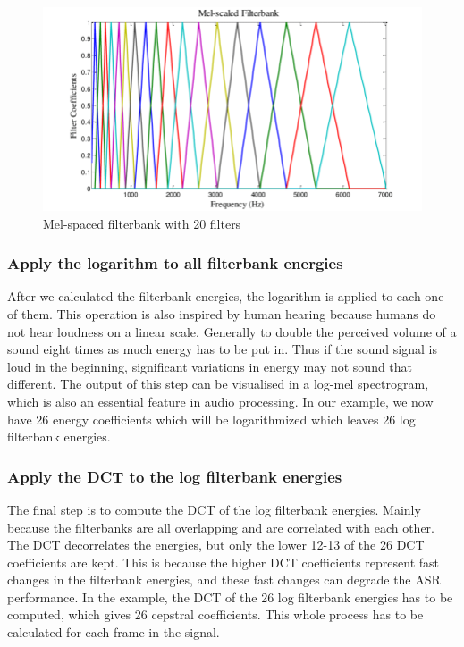 \begin{figure}[htbp]
	\centering
	\includegraphics[scale=0.4]{baa-documentation/img/Mel-filter-banks-basis-functions-using-20-Mel-filters-in-the-filter-bank.png}
	\caption[Mel-spaced filterbank with 20 filters]{Mel-spaced filterbank with 20 filters \footnotemark}
	\label{fig:MFCC-Mel-Filterbank}
\end{figure}

\subsubsection{Apply the logarithm to all filterbank energies}
After we calculated the filterbank energies, the logarithm is applied to each one of them. This operation is also inspired by human hearing because humans do not hear loudness on a linear scale. Generally to double the perceived volume of a sound eight times as much energy has to be put in. Thus if the sound signal is loud in the beginning, significant variations in energy may not sound that different. The output of this step can be visualised in a log-mel spectrogram, which is also an essential feature in audio processing.
\newline
\newline
In our example, we now have 26 energy coefficients which will be logarithmized which leaves 26 log filterbank energies.

\subsubsection{Apply the \gls{DCT} to the log filterbank energies}
The final step is to compute the \gls{DCT} of the log filterbank energies. Mainly because the filterbanks are all overlapping and are correlated with each other. The \gls{DCT} decorrelates the energies, but only the lower 12-13 of the 26 \gls{DCT} coefficients are kept. This is because the higher \gls{DCT} coefficients represent fast changes in the filterbank energies, and these fast changes can degrade the \gls{ASR} performance.
\newline
\newline
In the example, the \gls{DCT} of the 26 log filterbank energies has to be computed, which gives 26 cepstral coefficients. This whole process has to be calculated for each frame in the signal.

